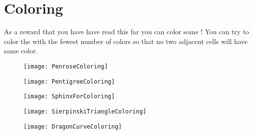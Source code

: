 
\chapter*{Coloring}
\label{chap:coloring}

As a reward that you have have read this far you can color some \lsystems!
You can try to color the \lsystems with the fewest number of colors so that no two adjacent cells will have same color.

\vspace{2cm}

\begin{figure}[h]
	\texttt{[image: PenroseColoring]}
\end{figure}

\vfill

\begin{figure}[p]
	\texttt{[image: PentigreeColoring]}
\end{figure}

\vfill

\begin{figure}[p]
	\texttt{[image: SphinxForColoring]}
\end{figure}

\vfill

\begin{figure}[p]
	\texttt{[image: SierpinskiTriangleColoring]}
\end{figure}

\vfill

\begin{figure}[p]
	\texttt{[image: DragonCurveColoring]}
\end{figure}

\vfill







